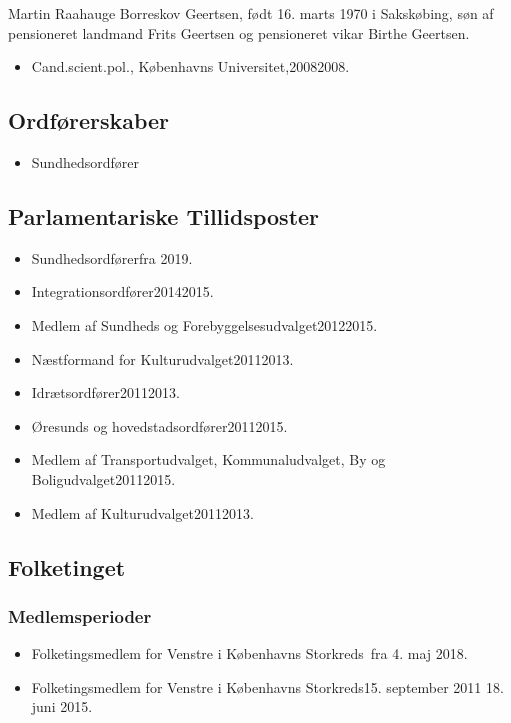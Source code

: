 \documentclass[11pt, a4paper]{awesome-cv}
\begin{document}
\makecvheader[R]
\makelettertitle
\begin{cvletter}
Martin Raahauge Borreskov Geertsen, født 16. marts 1970 i Sakskøbing, søn af pensioneret landmand Frits Geertsen og pensioneret vikar Birthe Geertsen.

\begin{itemize}
\item Cand.scient.pol., Københavns Universitet,20082008.
\end{itemize}
\subsection*{Ordførerskaber}
\begin{itemize}
\item Sundhedsordfører
\end{itemize}
\subsection*{Parlamentariske Tillidsposter}
\begin{itemize}
\item Sundhedsordførerfra 2019.
\item Integrationsordfører20142015.
\item Medlem af Sundheds og Forebyggelsesudvalget20122015.
\item Næstformand for Kulturudvalget20112013.
\item Idrætsordfører20112013.
\item Øresunds og hovedstadsordfører20112015.
\item Medlem af Transportudvalget, Kommunaludvalget, By og Boligudvalget20112015.
\item Medlem af Kulturudvalget20112013.
\end{itemize}
\subsection*{Folketinget}
\subsubsection*{Medlemsperioder}
\begin{itemize}
\item Folketingsmedlem for Venstre i Københavns Storkreds fra 4. maj 2018.
\item Folketingsmedlem for Venstre i Københavns Storkreds15. september 2011  18. juni 2015.
\end{itemize}

\end{cvletter}
\end{document}
